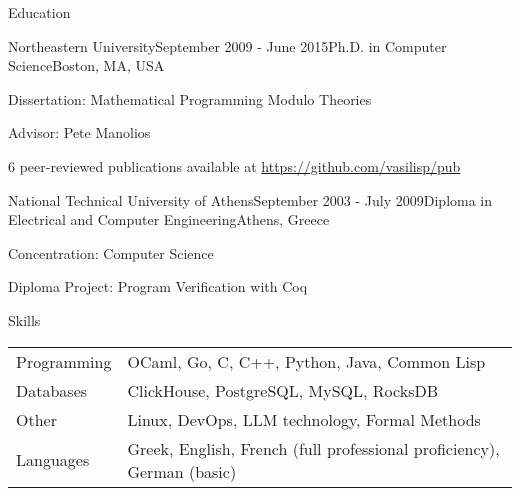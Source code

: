 \documentclass[11pt]{resume}
\begin{document}
\begin{rSection}{Education}

  \begin{rSubsection}{Northeastern University}{September 2009 -
      June 2015}{Ph.D. in Computer Science}{Boston, MA, USA}
  \item Dissertation: Mathematical Programming Modulo Theories
  \item Advisor: Pete Manolios
  \item 6 peer-reviewed publications available at
    \url{https://github.com/vasilisp/pub}
  \end{rSubsection}

  \begin{rSubsection}{National Technical University of Athens}{September 2003 -
      July 2009}{Diploma in Electrical and Computer
      Engineering}{Athens, Greece}
  \item Concentration: Computer Science
  \item Diploma Project: Program Verification with Coq
  \end{rSubsection}
	
\end{rSection}

\begin{rSection}{Skills}

  \begin{tabular}{ll}
    Programming & OCaml, Go, C, C++, Python, Java, Common Lisp \\

    Databases & ClickHouse, PostgreSQL, MySQL, RocksDB \\
    
    Other & Linux, DevOps, LLM technology, Formal Methods \\

    Languages & Greek, English, French (full professional
    proficiency), German (basic)
  \end{tabular}

\end{rSection}
\end{document}
